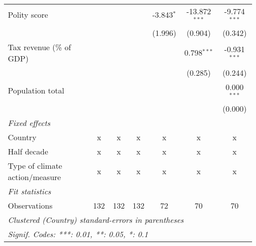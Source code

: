 \begin{tabular}{lcccccc}
   Polity score                                              &                &               &         & -3.843$^{*}$   & -13.872$^{***}$ & -9.774$^{***}$\\   
                                                             &                &               &         & (1.996)        & (0.904)         & (0.342)\\   
   Tax revenue (\% of GDP)                                   &                &               &         &                & 0.798$^{***}$   & -0.931$^{***}$\\   
                                                             &                &               &         &                & (0.285)         & (0.244)\\   
   Population total                                          &                &               &         &                &                 & 0.000$^{***}$\\   
                                                             &                &               &         &                &                 & (0.000)\\   
   \emph{Fixed effects}\\
   Country                                                   & x              & x             & x       & x              & x               & x\\  
   Half decade                                               & x              & x             & x       & x              & x               & x\\  
   Type of climate action/measure                            & x              & x             & x       & x              & x               & x\\  
   \midrule \emph{Fit statistics}\\
   Observations                                              & 132            & 132           & 132     & 72             & 70              & 70\\  
   \midrule
   \multicolumn{7}{l}{\emph{Clustered (Country) standard-errors in parentheses}}\\
   \multicolumn{7}{l}{\emph{Signif. Codes: ***: 0.01, **: 0.05, *: 0.1}}\\
\end{tabular}
\par\endgroup


